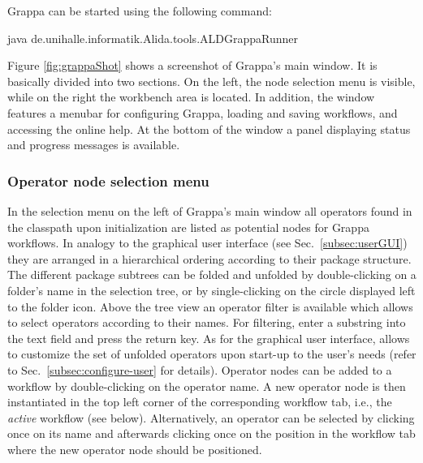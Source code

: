 \vspace*{-0.75cm}
Grappa can be started using the following command:
\vspace*{0.5cm}
\begin{code}
java de.unihalle.informatik.Alida.tools.ALDGrappaRunner
\end{code}

\vspace*{-0.25cm}
Figure \ref{fig:grappaShot} shows a screenshot of Grappa's main window. It is
basically divided into two sections. On the left, the node selection menu is
visible, while on the right the workbench area is located. 
In addition, the window features a menubar for configuring Grappa, loading and
saving workflows, and accessing the online help. At the bottom of the window a
panel displaying status and progress messages is available.

\subsubsection{Operator node selection menu} 
In the selection menu on the left of Grappa's main window all \alida operators found in the 
classpath upon initialization are listed as potential nodes for Grappa workflows. 
In analogy to the graphical user interface
 (see Sec.~\ref{subsec:userGUI}) they are arranged in a hierarchical ordering 
according to their package structure. The different package subtrees can be
folded and unfolded by double-clicking on a folder's name in the selection tree,
or by single-clicking on the circle displayed left to the folder icon. Above the
tree view an operator filter is available which allows to select operators
according to their names. For filtering, enter a substring into the text
field and press the return key. As for the graphical user interface, \alida
allows to customize the set of unfolded operators upon start-up to the user's needs
(refer to Sec.~\ref{subsec:configure-user} for details). 
Operator nodes can be added to a workflow by double-clicking on the operator
name. A new operator node is then instantiated in the top left corner of the
corresponding workflow tab, i.e., the {\em active} workflow (see below).
Alternatively, an operator can be selected by clicking once on its name 
and afterwards clicking once on the position in the workflow tab where the new
operator node should be positioned.
 
